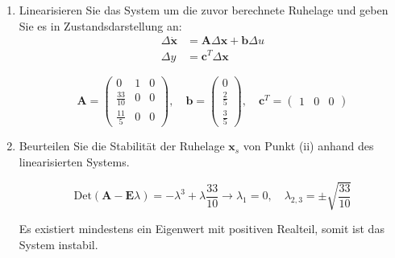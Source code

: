 \documentclass[crop=false]{standalone}
\begin{document}
\begin{task}
\begin{enumerate}[i]
\begin{solution}
    \end{solution}
\item Linearisieren Sie das System um die zuvor berechnete Ruhelage und geben Sie es
in Zustandsdarstellung an:
\[ 
\begin{aligned} \Delta \dot{\mathbf{x}} &=\mathbf{A} \Delta \mathbf{x}+\mathbf{b} \Delta u \\ \Delta y &=\mathbf{c}^{T} \Delta \mathbf{x} \end{aligned}
 \]
\begin{solution}
\[\mathbf{A} = \begin{pmatrix} 0 & 1 & 0 \\ \frac{33}{10} & 0 & 0 \\ \frac{11}{5} & 0 & 0\end{pmatrix},  \quad \mathbf{b} = \begin{pmatrix}0 \\ \frac{2}{5} \\ \frac{3}{5}\end{pmatrix}, \quad \mathbf{c}^T =  \begin{pmatrix}1 &0 &0\end{pmatrix}\]
    \end{solution}
    \item Beurteilen Sie die Stabilität der Ruhelage $\mathbf{x}_{s}$ von Punkt (ii) anhand des linearisierten Systems.
\begin{solution}
    \[\text{Det}\left( \mathbf{A} - \mathbf{E}\lambda \right) = - \lambda^3 + \lambda \frac{33}{10} \rightarrow \lambda_1 = 0, \quad \lambda_{2,3} = \pm \sqrt{\frac{33}{10}}\]
    
    Es existiert mindestens ein Eigenwert mit positiven Realteil, somit ist das System instabil.
\end{solution}
 \end{enumerate}
\end{task}
\end{document}
